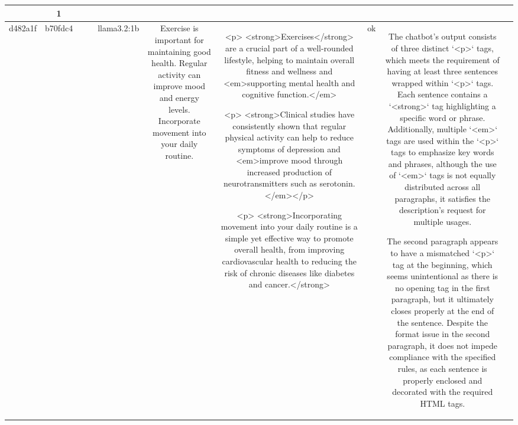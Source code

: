 \begin{table}[h!]
\begin{tabular}{|c|c|c|c|c|c|c|c|c|c|}
{{1. There are three `<p>` tags present in the output, which satisfies the requirement of having at least three `<p>` tags.

2. In each `<p>` tag, there is one `<strong>` tag used, which satisfies the requirement of having at least one `<strong>` tag in each paragraph. 

3. For the `<em>` tags:
   - In the first `<p>`, there are three `<em>` tags.
   - In the second `<p>`, there are no `<em>` tags, which violates the guideline of having multiple `<em>` tags in each paragraph.
   - In the third `<p>`, there are no `<em>` tags as well.

Since multiple `<em>` tags were required in each `<p>` tag, and this isn't met in the second and third `<p>` tags, the output does not comply with the chatbot description.

ERR & 1\\
\hline
d482a1f & b70fdc4 &  &  & llama3.2:1b & Exercise is important for maintaining good health. Regular activity can improve mood and energy levels. Incorporate movement into your daily routine. & <p>
<strong>Exercises</strong> are a crucial part of a well-rounded lifestyle, helping to maintain overall fitness and wellness and <em>supporting mental health and cognitive function.</em>

<p>
<strong>Clinical studies have consistently shown that regular physical activity can help to reduce symptoms of depression and <em>improve mood through increased production of neurotransmitters such as serotonin.</em></p>

<p>
<strong>Incorporating movement into your daily routine is a simple yet effective way to promote overall health, from improving cardiovascular health to reducing the risk of chronic diseases like diabetes and cancer.</strong> & ok & The chatbot's output consists of three distinct `<p>` tags, which meets the requirement of having at least three sentences wrapped within `<p>` tags. Each sentence contains a `<strong>` tag highlighting a specific word or phrase. Additionally, multiple `<em>` tags are used within the `<p>` tags to emphasize key words and phrases, although the use of `<em>` tags is not equally distributed across all paragraphs, it satisfies the description’s request for multiple usages. 

The second paragraph appears to have a mismatched `<p>` tag at the beginning, which seems unintentional as there is no opening tag in the first paragraph, but it ultimately closes properly at the end of the sentence. Despite the format issue in the second paragraph, it does not impede compliance with the specified rules, as each sentence is properly enclosed and decorated with the required HTML tags.

}}
\end{tabular}
\end{table}
